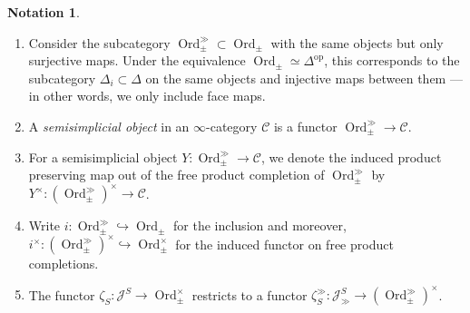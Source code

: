 \documentclass[12pt, reqno]{amsart}
\theoremstyle{plain}
\theoremstyle{definition}
\newtheorem{notation}[theorem]{Notation}
\begin{document}
\begin{notation}
\begin{enumerate}
\begin{equation*}
\begin{cases}
\bot & \theta_s(i)< \min J^s_q \\
\theta_s(i) & \theta_s(i)\in J^s_q \\
\top & \theta_s(i)> \max J^s_q.
\end{cases}
\end{equation*}
See  below for some intuition behind this definition.
\item Consider the subcategory $\operatorname{Ord}_\pm^\gg\subset \operatorname{Ord}_\pm$ with the same objects but only surjective maps. Under the equivalence $\operatorname{Ord}_\pm\simeq \Delta^{\operatorname{op}}$, this corresponds to the subcategory $\Delta_i\subset \Delta$ on the same objects and injective maps between them --- in other words, we only include face maps.
\item A \textit{semisimplicial object} in an $\infty$-category $\mathcal{C}$ is a functor $\operatorname{Ord}_\pm^\gg\rightarrow \mathcal{C}$.
\item For a semisimplicial object $Y\colon \operatorname{Ord}_\pm^\gg\rightarrow \mathcal{C}$, we denote the induced product preserving map out of the free product completion of $\operatorname{Ord}_\pm^\gg$ by $Y^\times\colon (\operatorname{Ord}_\pm^\gg)^\times\rightarrow \mathcal{C}$.
\item Write $i\colon \operatorname{Ord}_\pm^\gg\hookrightarrow \operatorname{Ord}_\pm$ for the inclusion and moreover, $i^\times\colon (\operatorname{Ord}_\pm^\gg)^\times\hookrightarrow \operatorname{Ord}_\pm^\times$ for the induced functor on free product completions.
\item The functor $\zeta_S\colon \mathcal{J}^S\rightarrow \operatorname{Ord}_\pm^\times$ restricts to a functor $\zeta_S^\gg\colon \mathcal{J}_\gg^S\rightarrow (\operatorname{Ord}_\pm^\gg)^\times$.\qedhere
\end{enumerate} 
\end{notation}
\end{document}
